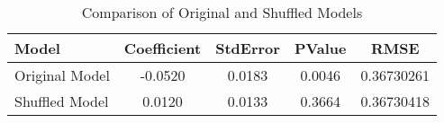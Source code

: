 \begin{table}[H]
\centering
\caption{Comparison of Original and Shuffled Models} 
\label{tab:model_comparison}
\begin{tabular}{lcccc}
  \hline \hline
Model & Coefficient & StdError & PValue & RMSE \\ 
  \hline
Original Model & -0.0520 & 0.0183 & 0.0046 & 0.36730261 \\ 
  Shuffled Model & 0.0120 & 0.0133 & 0.3664 & 0.36730418 \\ 
   \hline
\end{tabular}
\end{table}
